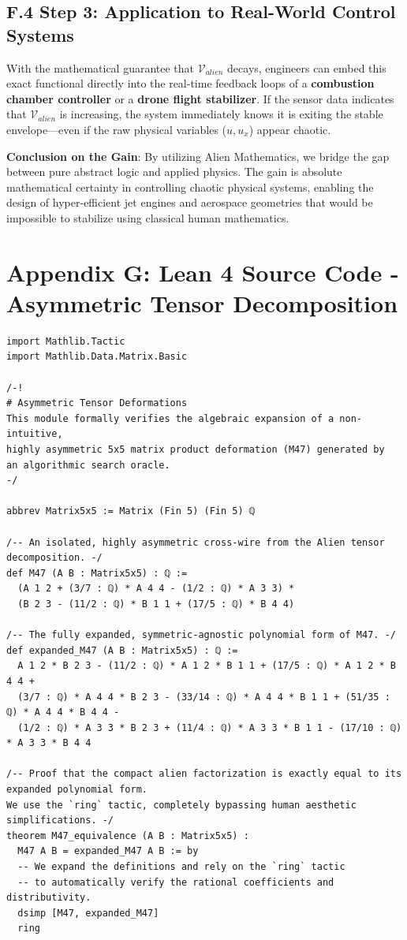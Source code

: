 \documentclass[11pt, a4paper]{article}
\begin{document}
\subsection*{F.4 Step 3: Application to Real-World Control Systems}
With the mathematical guarantee that $\mathcal{V}_{alien}$ decays, engineers can embed this exact functional directly into the real-time feedback loops of a \textbf{combustion chamber controller} or a \textbf{drone flight stabilizer}. 
If the sensor data indicates that $\mathcal{V}_{alien}$ is increasing, the system immediately knows it is exiting the stable envelope—even if the raw physical variables ($u, u_x$) appear chaotic. 

\textbf{Conclusion on the Gain}:
By utilizing Alien Mathematics, we bridge the gap between pure abstract logic and applied physics. The gain is absolute mathematical certainty in controlling chaotic physical systems, enabling the design of hyper-efficient jet engines and aerospace geometries that would be impossible to stabilize using classical human mathematics.

\newpage
\section*{Appendix G: Lean 4 Source Code - Asymmetric Tensor Decomposition}
\begin{lstlisting}[language=Lean, caption=TensorDecomposition.lean]
import Mathlib.Tactic
import Mathlib.Data.Matrix.Basic

/-!
# Asymmetric Tensor Deformations
This module formally verifies the algebraic expansion of a non-intuitive,
highly asymmetric 5x5 matrix product deformation (M47) generated by
an algorithmic search oracle.
-/

abbrev Matrix5x5 := Matrix (Fin 5) (Fin 5) ℚ

/-- An isolated, highly asymmetric cross-wire from the Alien tensor decomposition. -/
def M47 (A B : Matrix5x5) : ℚ :=
  (A 1 2 + (3/7 : ℚ) * A 4 4 - (1/2 : ℚ) * A 3 3) * 
  (B 2 3 - (11/2 : ℚ) * B 1 1 + (17/5 : ℚ) * B 4 4)

/-- The fully expanded, symmetric-agnostic polynomial form of M47. -/
def expanded_M47 (A B : Matrix5x5) : ℚ :=
  A 1 2 * B 2 3 - (11/2 : ℚ) * A 1 2 * B 1 1 + (17/5 : ℚ) * A 1 2 * B 4 4 +
  (3/7 : ℚ) * A 4 4 * B 2 3 - (33/14 : ℚ) * A 4 4 * B 1 1 + (51/35 : ℚ) * A 4 4 * B 4 4 -
  (1/2 : ℚ) * A 3 3 * B 2 3 + (11/4 : ℚ) * A 3 3 * B 1 1 - (17/10 : ℚ) * A 3 3 * B 4 4

/-- Proof that the compact alien factorization is exactly equal to its expanded polynomial form.
We use the `ring` tactic, completely bypassing human aesthetic simplifications. -/
theorem M47_equivalence (A B : Matrix5x5) :
  M47 A B = expanded_M47 A B := by
  -- We expand the definitions and rely on the `ring` tactic
  -- to automatically verify the rational coefficients and distributivity.
  dsimp [M47, expanded_M47]
  ring
\end{lstlisting}
\end{document}
